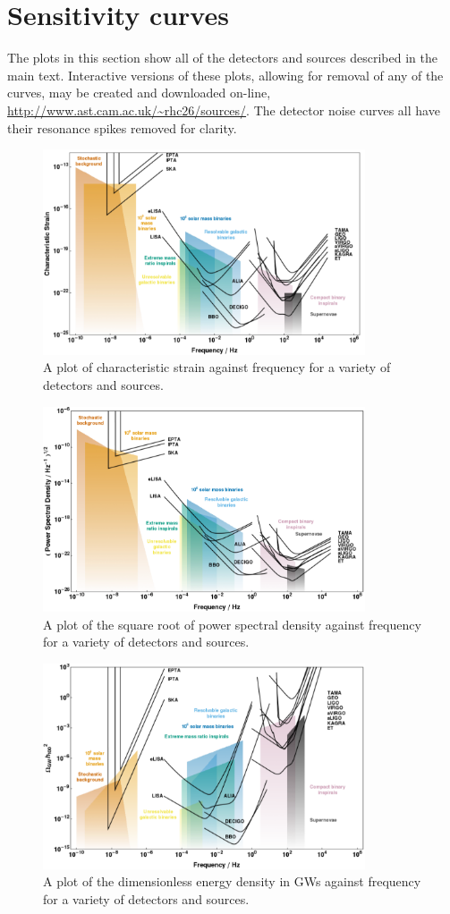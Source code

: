 \appendix
\section{Sensitivity curves}\label{app:a}
The plots in this section show all of the detectors and sources described in the main text. Interactive versions of these plots, allowing for removal of any of the curves, may be created and downloaded on-line, \url{http://www.ast.cam.ac.uk/~rhc26/sources/}. The detector noise curves all have their resonance spikes removed for clarity. 
\begin{figure}
 \centering
 \includegraphics[trim=0cm 0cm 0cm 0cm, width=0.85\textwidth]{figure1.pdf}
 \caption{A plot of characteristic strain against frequency for a variety of detectors and sources.}
 \label{fig:hc}
\end{figure}
\begin{figure}
 \centering
 \includegraphics[trim=0cm 0cm 0cm 0cm, width=0.85\textwidth]{figure2.pdf}
 \caption{A plot of the square root of power spectral density against frequency for a variety of detectors and sources.}
 \label{fig:S}
\end{figure}
\begin{figure}
 \centering
 \includegraphics[trim=0cm 0cm 0cm 0cm, width=0.85\textwidth]{figure3.pdf}
 \caption{A plot of the dimensionless energy density in GWs against frequency for a variety of detectors and sources.}
 \label{fig:omega}
\end{figure}

